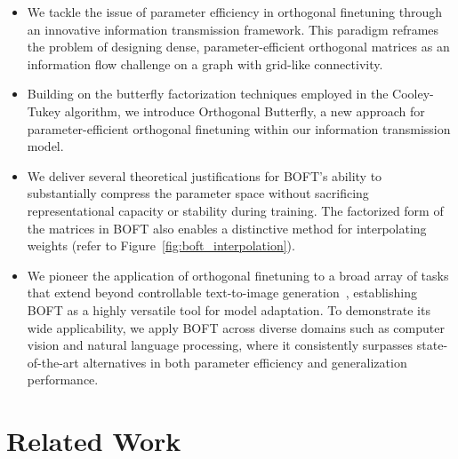 \begin{itemize}[leftmargin=*,nosep]
    \item We tackle the issue of parameter efficiency in orthogonal finetuning through an innovative information transmission framework. This paradigm reframes the problem of designing dense, parameter-efficient orthogonal matrices as an information flow challenge on a graph with grid-like connectivity.
    \item Building on the butterfly factorization techniques employed in the Cooley-Tukey algorithm, we introduce Orthogonal Butterfly, a new approach for parameter-efficient orthogonal finetuning within our information transmission model.
    \item We deliver several theoretical justifications for BOFT's ability to substantially compress the parameter space without sacrificing representational capacity or stability during training. The factorized form of the matrices in BOFT also enables a distinctive method for interpolating weights (refer to Figure~\ref{fig:boft_interpolation}).
    \item We pioneer the application of orthogonal finetuning to a broad array of tasks that extend beyond controllable text-to-image generation~\cite{qiu2023controlling}, establishing BOFT as a highly versatile tool for model adaptation. To demonstrate its wide applicability, we apply BOFT across diverse domains such as computer vision and natural language processing, where it consistently surpasses state-of-the-art alternatives in both parameter efficiency and generalization performance.
\end{itemize}

\section{Related Work}

